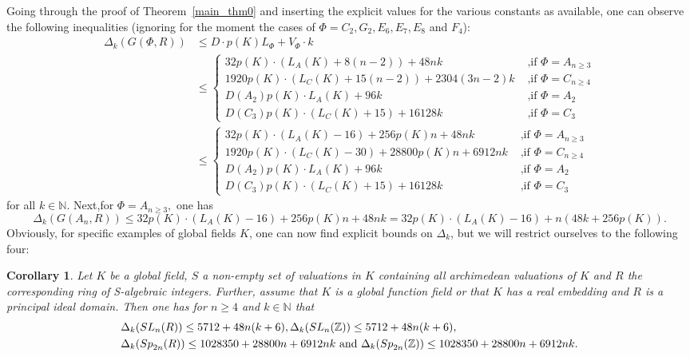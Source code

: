 \documentclass[12pt]{amsart}
\newtheorem{corollary}[theorem]{Corollary}
\theoremstyle{definition}\newtheorem{definition}[theorem]{Definition}
\theoremstyle{remark}\newtheorem{remark}[theorem]{Remark}
\theoremstyle{definition}\newtheorem{case}{Case}
\begin{document}
\label{bound_discussion}
Going through the proof of Theorem~\ref{main_thm0} and inserting the explicit values for the various constants as available, one can observe the following inequalities (ignoring for the moment the cases of $\Phi=C_2,G_2,E_6,E_7,E_8$ and $F_4$):
\begin{align*}
\Delta_k(G(\Phi,R))&\leq D\cdot p(K) L_{\Phi}+V_{\Phi}\cdot k\\
&\leq
\begin{cases}
32 p(K)\cdot(L_A(K)+8(n-2))+48nk&\text{ ,if }\Phi=A_{n\geq 3}\\
1920 p(K)\cdot(L_C(K)+15(n-2))+2304(3n-2)k&\text{ ,if }\Phi=C_{n\geq 4}\\
D(A_2) p(K)\cdot L_A(K)+96k&\text{ ,if }\Phi=A_2\\
D(C_3) p(K)\cdot (L_C(K)+15)+16128k&\text{ ,if }\Phi=C_3
\end{cases}\\
&\leq
\begin{cases}
32 p(K)\cdot(L_A(K)-16)+256p(K)n+48nk&\text{ ,if }\Phi=A_{n\geq 3}\\
1920 p(K)\cdot(L_C(K)-30)+28800p(K)n+6912nk&\text{ ,if }\Phi=C_{n\geq 4}\\
D(A_2) p(K)\cdot L_A(K)+96k&\text{ ,if }\Phi=A_2\\
D(C_3) p(K)\cdot (L_C(K)+15)+16128k&\text{ ,if }\Phi=C_3
\end{cases}
\end{align*}
for all $k\in\mathbb{N}.$ Next,for $\Phi=A_{n\geq 3},$ one has 
\[
\Delta_k(G(A_n,R))\leq 32 p(K)\cdot(L_A(K)-16)+256p(K)n+48nk=32 p(K)\cdot(L_A(K)-16)+ n(48k+256p(K)).
\]
Obviously, for specific examples of global fields $K$, one can now find explicit bounds on $\Delta_k$, but we will restrict ourselves to the following four:








\begin{corollary}\label{example}
Let $K$ be a global field, $S$ a non-empty set of valuations in $K$ containing all archimedean valuations of $K$ and $R$ the corresponding ring of S-algebraic integers. Further, assume that $K$ is a global function field or that $K$ has a real embedding and $R$ is a principal ideal domain. Then one has for $n\geq 4$ and $k\in\mathbb{N}$ that
\begin{align*}
&\Delta_k({\rm SL}_n(R))\leq 5712+48n(k+6),\Delta_k({\rm SL}_n(\mathbb{Z}))\leq 5712+48n(k+6),\\
&\Delta_k({\rm Sp}_{2n}(R))\leq 1028350+28800n +6912nk\text{ and }\Delta_k({\rm Sp}_{2n}(\mathbb{Z}))\leq 1028350+28800n+6912nk.
\end{align*}
\end{corollary}
\end{document}
